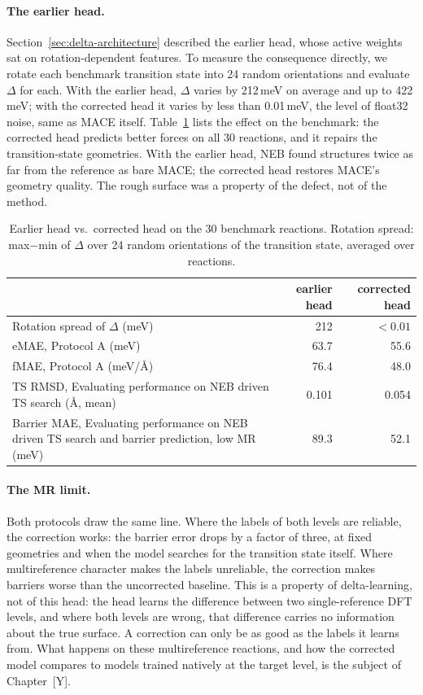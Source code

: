 \paragraph{The earlier head.}
Section~\ref{sec:delta-architecture} described the earlier head, whose
active weights sat on rotation-dependent features. To measure the
consequence directly, we rotate each benchmark transition state into 24
random orientations and evaluate $\Delta$ for each. With the earlier head,
$\Delta$ varies by 212\,meV on average and up to 422\,meV; with the
corrected head it varies by less than 0.01\,meV, the level of float32
noise, same as MACE itself. Table~\ref{tab:delta-audit} lists the effect on
the benchmark: the corrected head predicts better forces on all 30
reactions, and it repairs the transition-state geometries. With the earlier
head, NEB found structures twice as far from the reference as bare MACE;
the corrected head restores MACE's geometry quality. The rough surface was
a property of the defect, not of the method.

\begin{table}[htbp]
  \centering
  \caption{Earlier head vs.\ corrected head on the 30 benchmark reactions.
  Rotation spread: max$-$min of $\Delta$ over 24 random orientations of the
  transition state, averaged over reactions.}
  \label{tab:delta-audit}
  \begin{tabular}{lrr}
    \toprule
    & earlier head & corrected head \\
    \midrule
    Rotation spread of $\Delta$ (meV) & 212 & $<0.01$ \\
    eMAE, Protocol A (meV) & 63.7 & 55.6 \\
    fMAE, Protocol A (meV/\AA) & 76.4 & 48.0 \\
    TS RMSD, Evaluating performance on NEB driven TS search (\AA, mean) & 0.101 & 0.054 \\
    Barrier MAE, Evaluating performance on NEB driven TS search and barrier prediction, low MR (meV) & 89.3 & 52.1 \\
    \bottomrule
  \end{tabular}
\end{table}

\paragraph{The MR limit.}
Both protocols draw the same line. Where the labels of both levels are
reliable, the correction works: the barrier error drops by a factor of
three, at fixed geometries and when the model searches for the transition
state itself. Where multireference character makes the labels unreliable,
the correction makes barriers worse than the uncorrected baseline. This is
a property of delta-learning, not of this head: the head learns the
difference between two single-reference DFT levels, and where both levels
are wrong, that difference carries no information about the true surface.
A correction can only be as good as the labels it learns from. What happens
on these multireference reactions, and how the corrected model compares to
models trained natively at the target level, is the subject of
Chapter~[Y].
